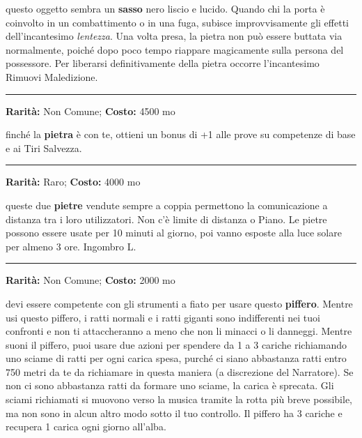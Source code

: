 \begin{multicols}{2}
questo oggetto sembra un \textbf{sasso} nero liscio e lucido. Quando chi la porta è coinvolto in un combattimento o in una fuga, subisce improvvisamente gli effetti dell'incantesimo \emph{lentezza}. Una volta presa, la pietra non può essere buttata via normalmente, poiché dopo poco tempo riappare magicamente sulla persona del possessore. Per liberarsi definitivamente della pietra occorre l'incantesimo Rimuovi Maledizione.

\smallskip\noindent\rule{\linewidth}{2pt}  \hypertarget{PietradellaBuonaSorte}{}\medskip{}\noindent\label{PietradellaBuonaSorte}

\textbf{Rarità:} Non Comune; \textbf{Costo:} 4500 mo

finché la \textbf{pietra} è con te, ottieni un bonus di +1 alle prove su competenze di base e ai Tiri Salvezza.

\smallskip\noindent\rule{\linewidth}{2pt}  \hypertarget{Pietreparlanti}{}\medskip{}\noindent\label{Pietreparlanti}

\textbf{Rarità:} Raro; \textbf{Costo:} 4000 mo

queste due \textbf{pietre} vendute sempre a coppia permettono la comunicazione a distanza tra i loro utilizzatori. Non c'è limite di distanza o Piano. Le pietre possono essere usate per 10 minuti al giorno, poi vanno esposte alla luce solare per almeno 3 ore. Ingombro L.

\smallskip\noindent\rule{\linewidth}{2pt}  \hypertarget{PifferodelleFogne}{}\medskip{}\noindent\label{PifferodelleFogne}

\textbf{Rarità:} Non Comune; \textbf{Costo:} 2000 mo

devi essere competente con gli strumenti a fiato per usare questo \textbf{piffero}. Mentre usi questo piffero, i ratti normali e i ratti giganti sono indifferenti nei tuoi confronti e non ti attaccheranno a meno che non li minacci o li danneggi. Mentre suoni il piffero, puoi usare due azioni per spendere da 1 a 3 cariche richiamando uno sciame di ratti per ogni carica spesa, purché ci siano abbastanza ratti entro 750 metri da te da richiamare in questa maniera (a discrezione del Narratore). Se non ci sono abbastanza ratti da formare uno sciame, la carica è sprecata. Gli sciami richiamati si muovono verso la musica tramite la rotta più breve possibile, ma non sono in alcun altro modo sotto il tuo controllo. Il piffero ha 3 cariche e recupera 1 carica ogni giorno all'alba.


\end{multicols}
